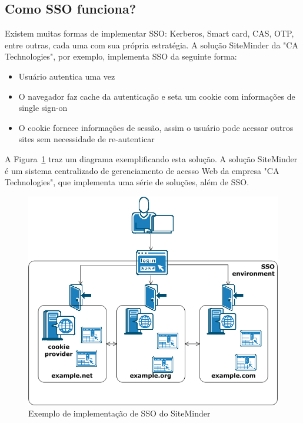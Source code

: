 \documentclass[11pt]{article}
\begin{document}
\subsection{Como SSO funciona?}

Existem muitas formas de implementar SSO: Kerberos, Smart card, CAS, OTP,
entre outras, cada uma com sua própria
estratégia\cite{opengroupSSO}. A solução
SiteMinder\cite{siteminderCA}
da "CA Technologies", por exemplo, implementa SSO da seguinte
forma\cite{siteminderDOCS}:

\begin{itemize}
  \item{Usuário autentica uma vez}
  \item{O navegador faz cache da autenticação e seta um cookie com
        informações de single sign-on}
  \item{O cookie fornece informações de sessão, assim o usuário pode acessar
        outros sites sem necessidade de re-autenticar}
\end{itemize}

A Figura~\ref{fig:sso-siteminder} traz um diagrama exemplificando esta
solução. A solução SiteMinder é um sistema centralizado de gerenciamento de
acesso Web da empresa "CA Technologies", que implementa uma série de soluções,
além de SSO.

\begin{figure}[h]
\center
\includegraphics[scale=0.6]{sso-siteminder.png}
\caption{Exemplo de implementação de SSO do SiteMinder}
\label{fig:sso-siteminder}
\end{figure}
\end{document}
